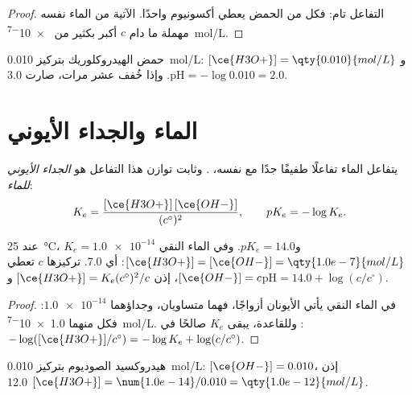\begin{proof}
التفاعل  تام: فكل  من الحمض
يعطي  أكسونيوم واحدًا.  الآتية من الماء نفسه مهملة
ما دام $c$ أكبر بكثير من \qty{e-7}{mol/L}.
\end{proof}

\begin{example}\label{ex:g12:ka-and-pka:hcl}
حمض الهيدروكلوريك بتركيز \qty{0.010}{mol/L}: $[\ce{H3O+}] = \qty{0.010}{mol/L}$
و$\mathrm{pH} = -\log 0.010 = 2.0$. وإذا خُفف عشر مرات، صارت  3.0.
\end{example}

\section{الماء والجداء الأيوني}


\begin{definition}\label{def:g12:ka-and-pka:ionic-product}
يتفاعل الماء تفاعلًا طفيفًا جدًا مع نفسه، . وثابت
توازن هذا التفاعل هو \emph{الجداء الأيوني
للماء}:
\[
  K_e = \frac{[\ce{H3O+}]\,[\ce{OH-}]}{(c^\circ)^2},
  \qquad pK_e = -\log K_e .
\]
\end{definition}

\begin{proposition}\label{prop:g12:ka-and-pka:ke}
عند \qty{25}{\celsius}، $K_e = \num{1.0e-14}$ و$pK_e = 14.0$. وفي الماء
النقي $[\ce{H3O+}] = [\ce{OH-}] = \qty{1.0e-7}{mol/L}$: أي  7.0.  تركيزها $c$ تعطي $[\ce{OH-}] = c$، إذن
$[\ce{H3O+}] = K_e (c^\circ)^2 / c$ و$\mathrm{pH} = 14.0 + \log(c/c^\circ)$.
\end{proposition}

\begin{proof}
في الماء النقي يأتي الأيونان أزواجًا، فهما متساويان،
وجداؤهما $\num{1.0e-14}$: فكل منهما \qty{1.0e-7}{mol/L}. وللقاعدة،
يبقى $K_e$ صالحًا في :
$-\log([\ce{H3O+}]/c^\circ) = -\log K_e + \log(c/c^\circ)$.
\end{proof}

\begin{example}\label{ex:g12:ka-and-pka:naoh}
هيدروكسيد الصوديوم بتركيز \qty{0.010}{mol/L}: $[\ce{OH-}] = 0.010$، إذن
$[\ce{H3O+}] = \num{1.0e-14}/0.010 = \qty{1.0e-12}{mol/L}$  12.0.
\end{example}

